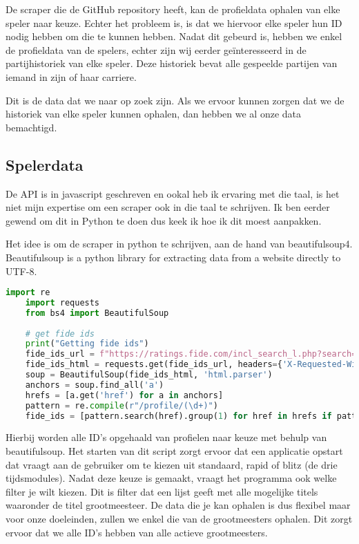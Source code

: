 De scraper die de GitHub repository heeft, kan de profieldata ophalen van elke speler naar keuze. Echter het probleem is, is dat we hiervoor elke speler hun ID nodig hebben om die te kunnen hebben. Nadat dit gebeurd is, hebben we enkel de profieldata van de spelers, echter zijn wij eerder geïnteresseerd in de partijhistoriek van elke speler. Deze historiek bevat alle gespeelde partijen van iemand in zijn of haar carriere. 

Dit is de data dat we naar op zoek zijn. Als we ervoor kunnen zorgen dat we de historiek van elke speler kunnen ophalen, dan hebben we al onze data bemachtigd.

\subsection{Spelerdata}

De API is in javascript geschreven en ookal heb ik ervaring met die taal, is het niet mijn expertise om een scraper ook in die taal te schrijven. Ik ben eerder gewend om dit in Python te doen dus keek ik hoe ik dit moest aanpakken. 

Het idee is om de scraper in python te schrijven, aan de hand van beautifulsoup4. Beautifulsoup is a python library for extracting data from a website directly to UTF-8.\autocite{Richardson}

\begin{lstlisting}[language=Python]
    import re
    import requests
    from bs4 import BeautifulSoup
    
    # get fide ids
    print("Getting fide ids")
    fide_ids_url = f"https://ratings.fide.com/incl_search_l.php?search=&search_rating={rating}&search_country=all&search_title={title}&search_other_title=all&search_year=undefined&search_low=0&search_high=3500&search_inactive=on&search_exrated=off&search_radio=rating&search_bday_start=all&search_bday_end=all&search_radio=rating&search_asc=descending&search_gender=undefined&simple=0"
    fide_ids_html = requests.get(fide_ids_url, headers={'X-Requested-With': 'XMLHttpRequest'}).text
    soup = BeautifulSoup(fide_ids_html, 'html.parser')
    anchors = soup.find_all('a')
    hrefs = [a.get('href') for a in anchors]
    pattern = re.compile(r"/profile/(\d+)")
    fide_ids = [pattern.search(href).group(1) for href in hrefs if pattern.search(href)]
\end{lstlisting}

Hierbij worden alle ID's opgehaald van profielen naar keuze met behulp van beautifulsoup. Het starten van dit script zorgt ervoor dat een applicatie opstart dat vraagt aan de gebruiker om te kiezen uit standaard, rapid of blitz (de drie tijdsmodules). Nadat deze keuze is gemaakt, vraagt het programma ook welke filter je wilt kiezen. Dit is filter dat een lijst geeft met alle mogelijke titels waaronder de titel grootmeesteer. De data die je kan ophalen is dus flexibel maar voor onze doeleinden, zullen we enkel die van de grootmeesters ophalen. Dit zorgt ervoor dat we alle ID's hebben van alle actieve grootmeesters. 

